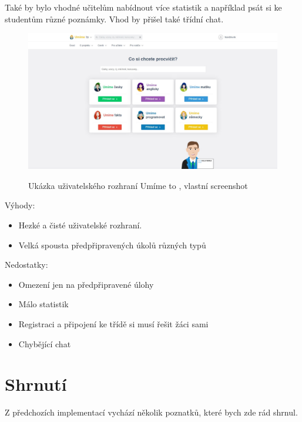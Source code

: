 Také by bylo vhodné učitelům nabídnout více statistik a například psát si ke studentům různé poznámky. Vhod by přišel také třídní chat.


\begin{figure}[H]
    \caption{Ukázka uživatelského rozhraní Umíme to \cite{umimeto}, vlastní screenshot}
    \centering
    \includegraphics[width=\textwidth]{images/umimeto}
    \label{img:umimeto}
\end{figure}

Výhody:
\begin{itemize}
  \item Hezké a čisté uživatelské rozhraní.
  \item Velká spousta předpřipravených úkolů různých typů
\end{itemize}

Nedostatky:
\begin{itemize}
  \item Omezení jen na předpřipravené úlohy
  \item Málo statistik
  \item Registraci a připojení ke třídě si musí řešit žáci sami
  \item Chybějící chat
\end{itemize}



\section{Shrnutí}

Z předchozích implementací vychází několik poznatků, které bych zde rád shrnul.

